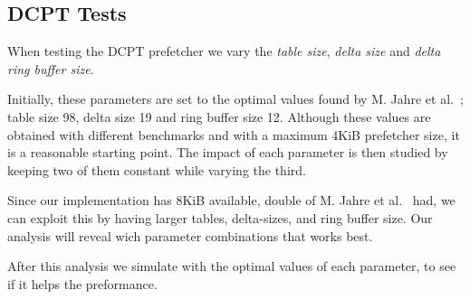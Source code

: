 \subsection{DCPT Tests}

When testing the DCPT prefetcher we vary the \emph{table size}, \emph{delta
size} and \emph{delta ring buffer size}.

Initially, these parameters are set to the optimal values found by M. Jahre et
al.~\cite{dcpt}; table size 98, delta size 19 and ring buffer size 12. Although
these values are obtained with different benchmarks and with a maximum 4KiB
prefetcher size, it is a reasonable starting point. The impact of each parameter
is then studied by keeping two of them constant while varying the third.

Since our implementation has 8KiB available, double of M. Jahre et
al.~\cite{dcpt} had, we can exploit this by having larger tables, delta-sizes,
and ring buffer size. Our analysis will reveal wich parameter combinations that
works best.

After this analysis we simulate with the optimal values of each parameter, to
see if it helps the preformance.

